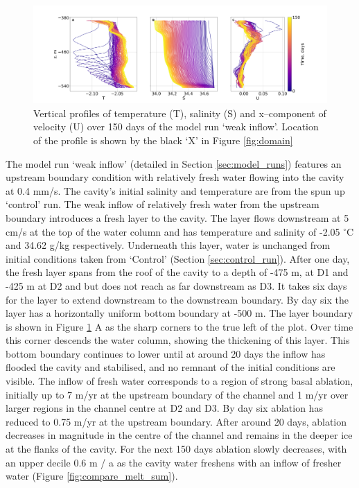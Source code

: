 \begin{figure}[!ht]
\centering
\includegraphics[width=1\textwidth]{chapters/4/weak_inflow_TSU.png}
\caption[]{Vertical profiles of temperature (T), salinity (S) and x--component of velocity (U) over 150 days of the model run `weak inflow'. Location of the profile is shown by the black `X' in Figure \ref{fig:domain}}
\label{fig:weak_inflow_TSU}
\end{figure}

The model run `weak inflow' (detailed in Section \ref{sec:model_runs}) features an upstream boundary condition with relatively fresh water flowing into the cavity at 0.4 mm/s. The cavity's initial salinity and temperature are from the spun up `control' run.
The weak inflow of relatively fresh water from the upstream boundary introduces a fresh layer to the cavity. The layer flows downstream at 5 cm/s at the top of the water column and has temperature and salinity of -2.05 $^{\circ}$C and 34.62 g/kg respectively. Underneath this layer, water is unchanged from initial conditions taken from `Control' (Section \ref{sec:control_run}). After one day, the fresh layer spans from the roof of the cavity to a depth of -475 m, at D1 and -425 m at D2 and but does not reach as far downstream as D3. It takes six days for the layer to extend downstream to the downstream boundary. By day six the layer has a horizontally uniform bottom boundary at -500 m. The layer boundary is shown in Figure \ref{fig:weak_inflow_TSU} A as the sharp corners to the true left of the plot. Over time this corner descends the water column, showing the thickening of this layer.  This bottom boundary continues to lower until at around 20 days the inflow has flooded the cavity and stabilised, and no remnant of the initial conditions are visible.  
The inflow of fresh water corresponds to a region of strong basal ablation, initially up to 7 m/yr at the upstream boundary of the channel and 1 m/yr over larger regions in the channel centre at D2 and D3. By day six ablation has reduced to 0.75 m/yr at the upstream boundary. After around 20 days, ablation decreases in magnitude in the centre of the channel and remains in the deeper ice at the flanks of the cavity. For the next 150 days ablation slowly decreases, with an upper decile 0.6 m / a as the cavity water freshens with an inflow of fresher water (Figure \ref{fig:compare_melt_sum}). 

